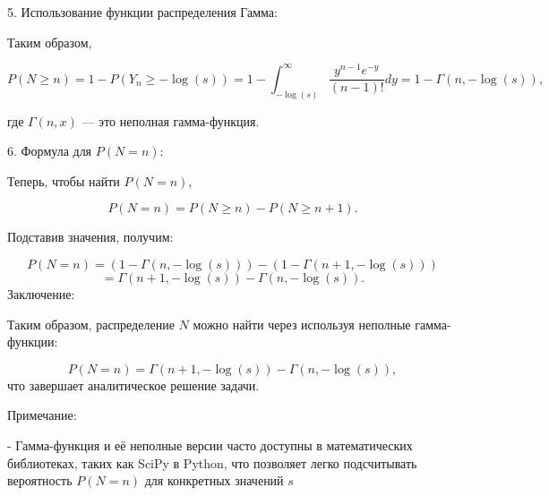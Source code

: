 \documentclass{article}
\begin{document}
 5. Использование функции распределения Гамма:

Таким образом,

\[
P(N \geq n) = 1 - P(Y_n \geq -\log(s)) = 1 - \int_{-\log(s)}^{\infty} \frac{y^{n-1} e^{-y}}{(n-1)!} dy = 1 - \Gamma(n, -\log(s)),
\]

где \( \Gamma(n, x) \) — это неполная гамма-функция.

6. Формула для \( P(N = n) \):

Теперь, чтобы найти \( P(N = n) \),

\[
P(N = n) = P(N \geq n) - P(N \geq n+1).
\]

Подставив значения, получим:

\[
P(N = n) = \left(1 - \Gamma(n, -\log(s))\right) - \left(1 - \Gamma(n+1, -\log(s))\right)
\]
\[
= \Gamma(n+1, -\log(s)) - \Gamma(n, -\log(s)).
\]
Заключение:

Таким образом, распределение \( N \) можно найти через используя неполные гамма-функции:

\[
P(N = n) = \Gamma(n+1, -\log(s)) - \Gamma(n, -\log(s)),
\]
что завершает аналитическое решение задачи.

Примечание:

- Гамма-функция и её неполные версии часто доступны в математических библиотеках, таких как SciPy в Python, что позволяет легко подсчитывать вероятность \( P(N = n) \) для конкретных значений \( s \)
\end{document}
